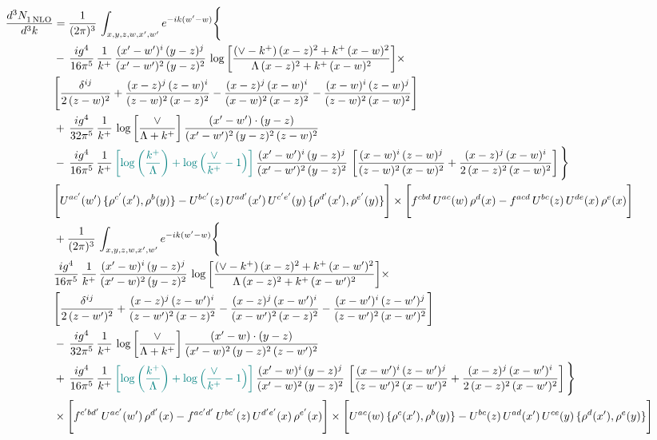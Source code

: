 \documentclass[9pt]{article}
\numberwithin{equation}{section}
\begin{document}
\begin{align}
 \frac{d^{3}N_{1\,\rm NLO}^{\rm}}{d^{3}k}  & =    \frac{1}{(2\pi)^{3}}\,\int_{x,y,z,w,x',w^{\prime}} e^{-ik(w^{\prime}-w)}\Bigg\{ \notag \\ & -\, \frac{ig^{4}}{16\pi^{5}}\,\frac{1}{k^{+}}\, \frac{(x'-w')^{i}\,(y-z)^{j}}{(x'-w')^{2}\,(y-z)^{2}}\,\log{\left[\frac{(\vee-k^{+})\,(x-z)^{2}+k^{+}\,(x-w)^{2}}{\Lambda\, (x-z)^{2}+k^{+}\,(x-w)^{2}}\right]}\times\notag \\ &  \Bigg[\frac{\delta^{ij}}{2\,(z-w)^{2}}+\frac{(x-z)^{j}\,(z-w)^{i}}{(z-w)^{2}\,(x-z)^{2}}-\frac{(x-z)^{j}\,(x-w)^{i}}{(x-w)^{2}\,(x-z)^{2}}-\frac{(x-w)^{i}\,(z-w)^{j}}{(z-w)^{2}\,(x-w)^{2}}\Bigg]\notag \\ & +\,\frac{ig^{4}}{32\pi^{5}}\,\frac{1}{k^{+}}\,\log{\left[\frac{\vee}{\Lambda + k^{+}}\right]}\, \frac{(x'-w')\cdot (y-z)}{(x'-w')^{2}\,(y-z)^{2}\,(z-w)^{2}}\notag \\ & -\, \frac{ig^{4}}{16\pi^{5}}\,\frac{1}{k^{+}}\,{\color{teal}\left[\log{\left(\frac{k^{+}}{\Lambda}\right)}+\log{\left(\frac{\vee}{k^{+}}-1\right)}\right]}\,\frac{(x'-w')^{i}\,(y-z)^{j}}{(x'-w')^{2}\,(y-z)^{2}}\,\left[\frac{(x-w)^{i}\,(z-w)^{j}}{(z-w)^{2}\,(x-w)^{2}}+\frac{(x-z)^{j}\,(x-w)^{i}}{2\,(x-z)^{2}\, (x-w)^{2}}\right]\Bigg\} \notag \\ & \Bigg[U^{ac'}(w')\,\{\rho^{c'}(x'),\rho^{b}(y)\}-U^{bc'}(z)\,U^{ad'}(x')\,U^{c'e'}(y)\, \{\rho^{d'}(x'),\rho^{e'}(y)\}\Bigg]\times \Bigg[f^{cbd}\,U^{ac}(w)\,\rho^{d}(x)-f^{acd}\, U^{bc}(z)\,U^{de}(x)\,\rho^{e}(x)\Bigg]\notag \\ & + \frac{1}{(2\pi)^{3}}\,\int_{x,y,z,w,x',w^{\prime}} e^{-ik(w^{\prime}-w)}\Bigg\{ \notag \\ &  \frac{ig^{4}}{16\pi^{5}}\,\frac{1}{k^{+}}\, \frac{(x'-w)^{i}\,(y-z)^{j}}{(x'-w)^{2}\,(y-z)^{2}}\,\log{\left[\frac{(\vee-k^{+})\,(x-z)^{2}+k^{+}\,(x-w')^{2}}{\Lambda\, (x-z)^{2} + k^{+}\,(x-w')^{2}}\right]}\times\notag \\ &  \Bigg[\frac{\delta^{ij}}{2\,(z-w')^{2}}+\frac{(x-z)^{j}\,(z-w')^{i}}{(z-w')^{2}\,(x-z)^{2}}-\frac{(x-z)^{j}\,(x-w')^{i}}{(x-w')^{2}\,(x-z)^{2}}-\frac{(x-w')^{i}\,(z-w')^{j}}{(z-w')^{2}\,(x-w')^{2}}\Bigg]\notag \\ & -\,\frac{ig^{4}}{32\pi^{5}}\,\frac{1}{k^{+}}\,\log{\left[\frac{\vee}{\Lambda + k^{+}}\right]}\, \frac{(x'-w)\cdot (y-z)}{(x'-w)^{2}\,(y-z)^{2}\,(z-w')^{2}}\notag \\ & +\,\frac{ig^{4}}{16\pi^{5}}\,\frac{1}{k^{+}}\,{\color{teal}\left[\log{\left(\frac{k^{+}}{\Lambda}\right)}+\log{\left(\frac{\vee}{k^{+}}-1\right)}\right]}\,\frac{(x'-w)^{i}\,(y-z)^{j}}{(x'-w)^{2}\,(y-z)^{2}}\,\left[\frac{(x-w')^{i}\,(z-w')^{j}}{(z-w')^{2}\,(x-w')^{2}}+\frac{(x-z)^{j}\,(x-w')^{i}}{2\,(x-z)^{2}\, (x-w')^{2}}\right] \Bigg\} \notag \\ & \times\Bigg[f^{c'bd'}\,U^{ac'}(w')\,\rho^{d'}(x)-f^{ac'd'}\, U^{bc'}(z)\,U^{d'e'}(x)\,\rho^{e'}(x)\Bigg] \times \Bigg[U^{ac}(w)\,\{\rho^{c}(x'),\rho^{b}(y)\}-U^{bc}(z)\,U^{ad}(x')\,U^{ce}(y)\, \{\rho^{d}(x'),\rho^{e}(y)\}\Bigg]
\end{align}
\end{document}
